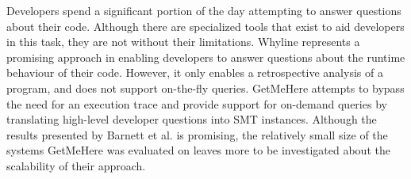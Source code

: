 \par Developers spend a significant portion of the day attempting to answer
questions about their code.
Although there are specialized tools that exist to aid developers in this task,
they are not without their limitations. 
Whyline represents a promising approach in enabling developers to answer 
questions about the runtime behaviour of their code.
However, it only enables a retrospective analysis of a program, and does not 
support on-the-fly queries.
GetMeHere attempts to bypass the need for an execution trace and provide support
for on-demand queries by translating high-level developer questions into SMT
instances. 
Although the results presented by Barnett et al. is promising, the
relatively small size of the systems GetMeHere was evaluated on leaves more to
be investigated about the scalability of their approach.

\endinput

TODO: add a paragraph about what my thesis attempts to contribute (in relation
to the related work section).


